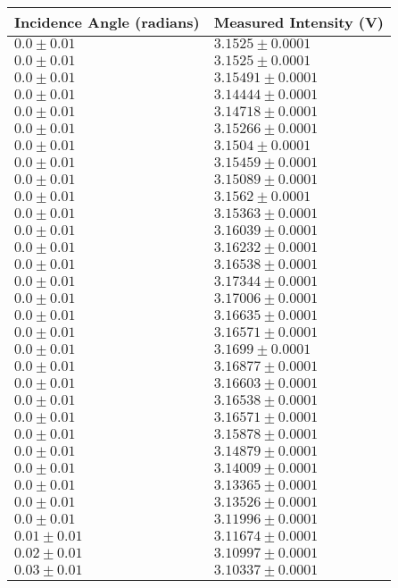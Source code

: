 \begin{tabular}{| p{} | p{} |}
\hline
Incidence Angle (radians) & Measured Intensity (V)\\
\hline
$0.0 \pm 0.01$ & $3.1525 \pm 0.0001$\\
$0.0 \pm 0.01$ & $3.1525 \pm 0.0001$\\
$0.0 \pm 0.01$ & $3.15491 \pm 0.0001$\\
$0.0 \pm 0.01$ & $3.14444 \pm 0.0001$\\
$0.0 \pm 0.01$ & $3.14718 \pm 0.0001$\\
$0.0 \pm 0.01$ & $3.15266 \pm 0.0001$\\
$0.0 \pm 0.01$ & $3.1504 \pm 0.0001$\\
$0.0 \pm 0.01$ & $3.15459 \pm 0.0001$\\
$0.0 \pm 0.01$ & $3.15089 \pm 0.0001$\\
$0.0 \pm 0.01$ & $3.1562 \pm 0.0001$\\
$0.0 \pm 0.01$ & $3.15363 \pm 0.0001$\\
$0.0 \pm 0.01$ & $3.16039 \pm 0.0001$\\
$0.0 \pm 0.01$ & $3.16232 \pm 0.0001$\\
$0.0 \pm 0.01$ & $3.16538 \pm 0.0001$\\
$0.0 \pm 0.01$ & $3.17344 \pm 0.0001$\\
$0.0 \pm 0.01$ & $3.17006 \pm 0.0001$\\
$0.0 \pm 0.01$ & $3.16635 \pm 0.0001$\\
$0.0 \pm 0.01$ & $3.16571 \pm 0.0001$\\
$0.0 \pm 0.01$ & $3.1699 \pm 0.0001$\\
$0.0 \pm 0.01$ & $3.16877 \pm 0.0001$\\
$0.0 \pm 0.01$ & $3.16603 \pm 0.0001$\\
$0.0 \pm 0.01$ & $3.16538 \pm 0.0001$\\
$0.0 \pm 0.01$ & $3.16571 \pm 0.0001$\\
$0.0 \pm 0.01$ & $3.15878 \pm 0.0001$\\
$0.0 \pm 0.01$ & $3.14879 \pm 0.0001$\\
$0.0 \pm 0.01$ & $3.14009 \pm 0.0001$\\
$0.0 \pm 0.01$ & $3.13365 \pm 0.0001$\\
$0.0 \pm 0.01$ & $3.13526 \pm 0.0001$\\
$0.0 \pm 0.01$ & $3.11996 \pm 0.0001$\\
$0.01 \pm 0.01$ & $3.11674 \pm 0.0001$\\
$0.02 \pm 0.01$ & $3.10997 \pm 0.0001$\\
$0.03 \pm 0.01$ & $3.10337 \pm 0.0001$\\
\hline
\end{tabular}\hfill

